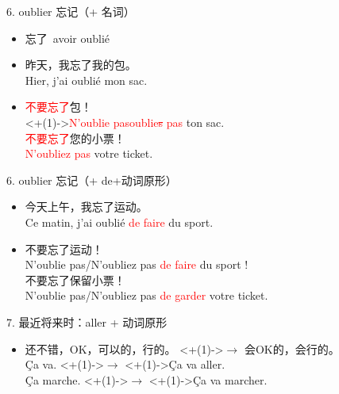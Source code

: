 \documentclass[french, aspectratio=169, 14pt, handout]{beamer}
\newcommand{\red}[1]{\textcolor{red}{#1}} %
\begin{document}
\begin{CJK*}{UTF8}{gkai}
\begin{frame}{6. oublier 忘记（+ 名词）}
\begin{itemize}
    \item 忘了~avoir oublié \pause
    \item 昨天，我忘了我的包。 \pause \\ Hier, j'ai oublié mon sac. \pause
	\item \red{不要忘了}包！ \pause \\ \alt<+(1)->{\red{N'oublie pas}}{\red{oublie\sout{s} pas}} ton sac.  \pause \\
	\red{不要忘了}您的小票！ \pause \\ \red{N'oubliez pas} \pause votre ticket.  \pause
\end{itemize}
\end{frame}

\begin{frame}{6. oublier 忘记（+ de+动词原形）}
\begin{itemize}
	\item 今天上午，我忘了运动。 \pause \\ Ce matin, j'ai oublié \pause \red{de} \pause \red{faire} du sport. \pause
	\item 不要忘了运动！\\ N'oublie pas/N'oubliez pas \pause \red{de} \pause \red{faire} du sport !  \pause \\ 
	不要忘了保留小票！\\ N'oublie pas/N'oubliez pas \pause \red{de} \pause \red{garder} votre ticket. 
\end{itemize}
\end{frame}

\begin{frame}{7. 最近将来时：aller + 动词原形}
\begin{itemize}
	\item 还不错，OK，可以的，行的。
	\visible<+(1)->{$\rightarrow$  会OK的，会行的。} \\
	Ça va.  \visible<+(1)->{$\rightarrow$}  \visible<+(1)->{Ça va aller.}  \\
	Ça marche.  \visible<+(1)->{$\rightarrow$} \visible<+(1)->{Ça va marcher}.
\end{itemize}
\end{frame}


\end{CJK*}
\end{document}
